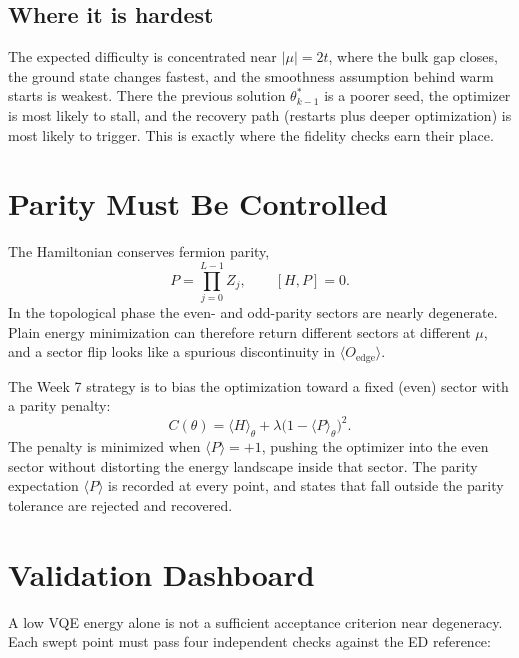 \documentclass[11pt]{article}
\begin{document}
\subsection*{Where it is hardest}

The expected difficulty is concentrated near $|\mu|=2t$, where the bulk gap closes, the ground state changes fastest, and the smoothness assumption behind warm starts is weakest. There the previous solution $\theta_{k-1}^{*}$ is a poorer seed, the optimizer is most likely to stall, and the recovery path (restarts plus deeper optimization) is most likely to trigger. This is exactly where the fidelity checks earn their place.

\section{Parity Must Be Controlled}

The Hamiltonian conserves fermion parity,
\begin{equation}
  P=\prod_{j=0}^{L-1}Z_j, \qquad [H,P]=0.
\end{equation}
In the topological phase the even- and odd-parity sectors are nearly degenerate. Plain energy minimization can therefore return different sectors at different $\mu$, and a sector flip looks like a spurious discontinuity in $\langle O_{\mathrm{edge}}\rangle$.

The Week 7 strategy is to bias the optimization toward a fixed (even) sector with a parity penalty:
\begin{equation}
  C(\theta) = \langle H\rangle_\theta + \lambda\bigl(1-\langle P\rangle_\theta\bigr)^2.
\end{equation}
The penalty is minimized when $\langle P\rangle = +1$, pushing the optimizer into the even sector without distorting the energy landscape inside that sector. The parity expectation $\langle P\rangle$ is recorded at every point, and states that fall outside the parity tolerance are rejected and recovered.

\section{Validation Dashboard}

A low VQE energy alone is not a sufficient acceptance criterion near degeneracy. Each swept point must pass four independent checks against the ED reference:
\end{document}
